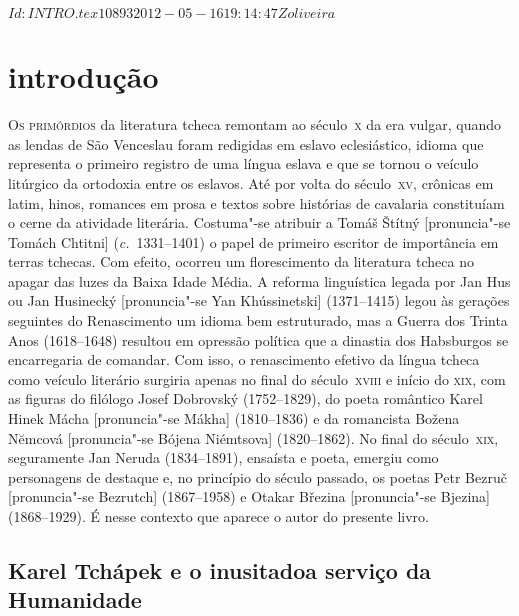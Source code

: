 \SVN $Id: INTRO.tex 10893 2012-05-16 19:14:47Z oliveira $
\chapter[Introdução, por Aleksandar Jovanović]{introdução}

\textsc{Os primórdios} da literatura tcheca remontam ao século~\textsc{x} da era vulgar,
quando as lendas de São Venceslau foram redigidas em eslavo eclesiástico,
idioma que representa o primeiro registro de uma língua eslava e que se tornou
o veículo litúrgico da ortodoxia entre os eslavos. Até por volta do século~\textsc{xv},
crônicas em latim, hinos, romances em prosa e textos sobre histórias de
cavalaria constituíam o cerne da atividade literária. Costuma"-se atribuir a
Tomáš Št\'{i}tný [pronuncia"-se Tomách Chtitni] (\textit{c.}~1331--1401) o papel
de primeiro escritor de importância em terras tchecas. Com efeito, ocorreu um
florescimento da literatura tcheca no apagar das luzes da Baixa Idade Média. A
reforma linguística legada por Jan Hus ou Jan Husinecký [pronuncia"-se Yan
Khússinetski] (1371--1415) legou às gerações seguintes do Renascimento um
idioma bem estruturado, mas a Guerra dos Trinta Anos (1618--1648) resultou em
opressão política que a dinastia dos Habsburgos se encarregaria de comandar.
Com isso, o renascimento efetivo da língua tcheca como veículo literário
surgiria apenas no final do século~\textsc{xviii} e início do \textsc{xix}, com as figuras do
filólogo Josef Dobrovský (1752--1829), do poeta romântico Karel Hinek Mácha
[pronuncia"-se Mákha] (1810--1836) e da romancista Božena N\u{e}mcová
[pronuncia"-se Bójena Niémtsova] (1820--1862). No final do século~\textsc{xix},
seguramente Jan Neruda (1834--1891), ensaísta e poeta, emergiu como personagens
de destaque e, no princípio do século passado, os poetas Petr Bezruč
[pronuncia"-se Bezrutch] (1867--1958) e Otakar Březina [pronuncia"-se Bjezina]
(1868--1929). É nesse contexto que aparece o autor do presente livro.

\section{Karel Tchápek e o inusitado\break a serviço da Humanidade}


